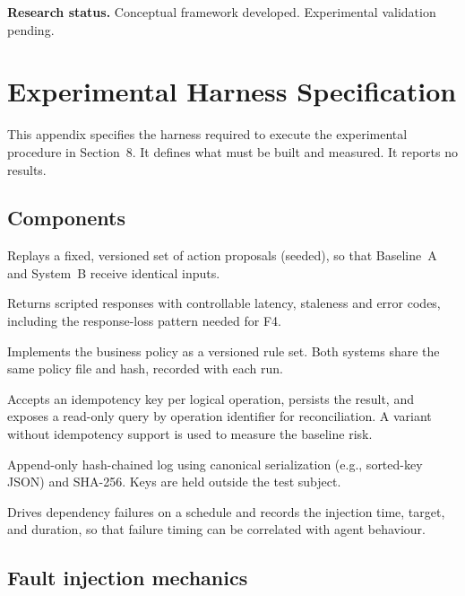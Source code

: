 \documentclass[11pt,a4paper]{article}
\begin{document}
\vspace{1em}
\noindent\textbf{Research status.} Conceptual framework developed. Experimental validation pending.

\appendix
\section{Experimental Harness Specification}

This appendix specifies the harness required to execute the experimental procedure in Section~8. It defines what must be built and measured. It reports no results.

\subsection{Components}

\begin{description}[leftmargin=0pt,style=nextline]
  \item[Deterministic agent driver.] Replays a fixed, versioned set of action proposals (seeded), so that Baseline~A and System~B receive identical inputs.
  \item[Simulated enterprise connector.] Returns scripted responses with controllable latency, staleness and error codes, including the response-loss pattern needed for F4.
  \item[Authorization service.] Implements the business policy as a versioned rule set. Both systems share the same policy file and hash, recorded with each run.
  \item[Payment execution API.] Accepts an idempotency key per logical operation, persists the result, and exposes a read-only query by operation identifier for reconciliation. A variant without idempotency support is used to measure the baseline risk.
  \item[Evidence ledger.] Append-only hash-chained log using canonical serialization (e.g., sorted-key JSON) and SHA-256. Keys are held outside the test subject.
  \item[Fault injection controller.] Drives dependency failures on a schedule and records the injection time, target, and duration, so that failure timing can be correlated with agent behaviour.
\end{description}

\subsection{Fault injection mechanics}
\end{document}
